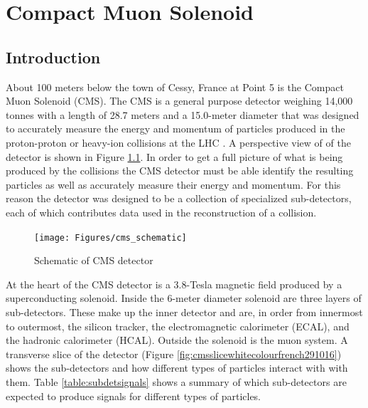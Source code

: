\chapter{Compact Muon Solenoid}

\section{Introduction}
About 100 meters below the town of Cessy, France at Point 5 is the Compact Muon Solenoid (CMS).  The CMS is a general purpose detector weighing 14,000 tonnes with a length of 28.7 meters and a 15.0-meter diameter that was designed to accurately measure the energy and momentum of particles produced in the proton-proton or heavy-ion collisions at the LHC \cite{Collaboration_2008}.  A perspective view of of the detector is shown in Figure \ref{fig:cmsschematic}.  In order to get a full picture of what is being produced by the collisions the CMS detector must be able identify the resulting particles as well as accurately measure their energy and momentum.  For this reason the detector was designed to be a collection of specialized sub-detectors, each of which contributes data used in the reconstruction of a collision.  
\begin{figure}[h]
	\centering
	\texttt{[image: Figures/cms\_schematic]}
	\caption{Schematic of CMS detector \cite{Sakuma_2014}}
	\label{fig:cmsschematic}
\end{figure}

At the heart of the CMS detector is a 3.8-Tesla magnetic field produced by a superconducting solenoid.  Inside the 6-meter diameter solenoid are three layers of sub-detectors.  These make up the inner detector and are, in order from innermost to outermost, the silicon tracker, the electromagnetic calorimeter (ECAL), and the hadronic calorimeter (HCAL).  Outside the solenoid is the muon system.  A transverse slice of the detector (Figure \ref{fig:cmsslicewhitecolourfrench291016}) shows the sub-detectors and how different types of particles interact with with them.  Table \ref{table:subdetsignals} shows a summary of which sub-detectors are expected to produce signals for different types of particles. 

